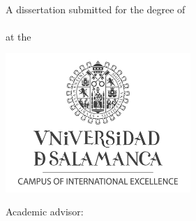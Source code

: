 \begin{titlepage}
    \begin{addmargin}[-1cm]{-3cm}
    \begin{center}
        \LARGE

        \hfill

		\vspace{0.7cm}

        \begingroup
            \color{CTtitle}\spacedallcaps{\myTitle} \\ \bigskip
        \endgroup
		
		\vspace{0.7cm}
		
		\large
        \spacedallcaps{\myName}
        
        \vspace{1.5cm}
        
        A dissertation submitted for the degree of \\ \medskip
         \\ \bigskip
        at the \\ \medskip
        \spacedallcaps{\myUni}
        
        
        \vspace{0.7cm}


        \includegraphics[width=7cm]{gfx/Logo_USAL_Eng_Gris_2012} \\ \medskip
        
        \vspace{1cm}

        Academic advisor: \mySupervisor \\ \medskip
        

\end{center}
\end{addmargin}
\end{titlepage}
